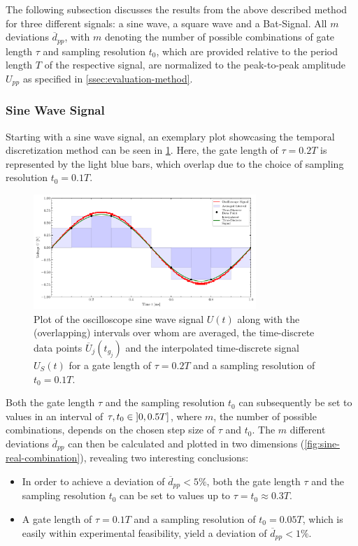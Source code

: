 The following subsection discusses the results from the above described method for three different signals: a sine wave, a square wave and a Bat-Signal. All $m$ deviations $\overline{d}_{pp}$, with $m$ denoting the number of possible combinations of gate length $\tau$ and sampling resolution $t_0$, which are provided relative to the period length $T$ of the respective signal, are normalized to the peak-to-peak amplitude $U_{pp}$ as specified in \cref{ssec:evaluation-method}.
\subsubsection{Sine Wave Signal} \label{sssec:sine-wave}
Starting with a sine wave signal, an exemplary plot showcasing the temporal discretization method can be seen in \cref{fig:sine-real-i2000-s1000}. Here, the gate length of $\tau = 0.2T$ is represented by the light blue bars, which overlap due to the choice of sampling resolution $t_0 = 0.1T$. 
\begin{figure}[H]
	\centering
	\includegraphics[width=0.75\textwidth]{Figures/Signals/sine_real_i2000_s1000.pdf}
	\caption{Plot of the oscilloscope sine wave signal $U\left(t\right)$ along with the (overlapping) intervals over whom are averaged, the time-discrete data points $\overline{U}_j\left(t_{g_j}\right)$ and the interpolated time-discrete signal $U_S\left(t\right)$ for a gate length of $\tau = 0.2T$ and a sampling resolution of $t_0 = 0.1T$.}
	\label{fig:sine-real-i2000-s1000}
\end{figure}
Both the gate length $\tau$ and the sampling resolution $t_0$ can subsequently be set to values in an interval of $\tau, t_0 \in \interval[scaled, open left]{0}{0.5T}$, where $m$, the number of possible combinations, depends on the chosen step size of $\tau$ and $t_0$. The $m$ different deviations $\overline{d}_{pp}$ can then be calculated and plotted in two dimensions (\cref{fig:sine-real-combination}), revealing two interesting conclusions:
\begin{itemize}
	\item In order to achieve a deviation of $\overline{d}_{pp} < 5\%$, both the gate length $\tau$ and the sampling resolution $t_0$ can be set to values up to $\tau = t_0 \approx 0.3T$.
	\item A gate length of $\tau = 0.1T$ and a sampling resolution of $t_0 = 0.05T$, which is easily within experimental feasibility, yield a deviation of $\overline{d}_{pp} < 1\%$.
\end{itemize}

